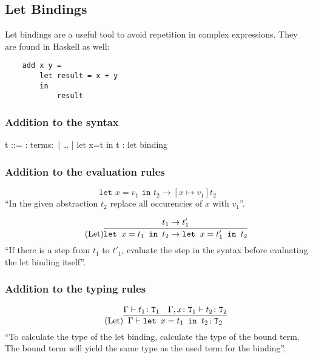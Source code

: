 \subsection{Let Bindings}
\label{subsec:let}

Let bindings are a useful tool to avoid repetition in complex expressions.
They are found in Haskell as well:

\begin{verbatim}
    add x y =
        let result = x + y
        in
            result
\end{verbatim}

\subsubsection{Addition to the syntax \cite{pierce2002ProgLang}}
\begin{bnfgrammar}
    t ::= : terms$\colon$
    | \dots
    | let x=t in t : let binding
\end{bnfgrammar}\leavevmode\newline

\subsubsection{Addition to the evaluation rules \cite{pierce2002ProgLang}}
\begin{equation*}
    \tag{Let-Bind Value}
    \texttt{let } x=v_1 \texttt{ in } t_2 \rightarrow [x \mapsto v_1] t_2
\end{equation*}
``In the given abstraction $t_2$ replace all occurencies of $x$ with $v_1$''.

\begin{equation*}
    \tag{Let}
    \infer{
        \texttt{let } x=t_1 \texttt{ in } t_2 \rightarrow \texttt{let } x=t'_1 \texttt{ in } t_2
    }{
        t_1 \rightarrow t'_1
    }
\end{equation*}
``If there is a step from $t_1$ to $t'_1$, evaluate the step
in the syntax before evaluating the let binding itself''.

\subsubsection{Addition to the typing rules \cite{pierce2002ProgLang}}
\begin{equation*}
    \tag{Let}
    \infer{
        \Gamma \vdash \texttt{let } x=t_1 \texttt{ in } t_2 \colon \texttt{T}_2
    }{
        \Gamma \vdash t_1 \colon \texttt{T}_1 & \Gamma , x \colon \texttt{T}_1 \vdash t_2 \colon \texttt{T}_2
    }
\end{equation*}
``To calculate the type of the let binding, calculate the type of the bound term. The bound
term will yield the same type as the used term for the binding''.
